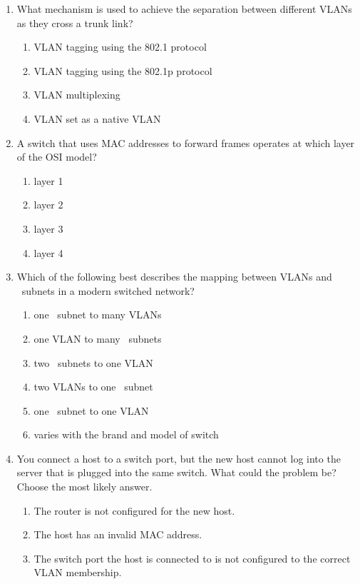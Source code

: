 \begin{enumerate}
\begin{enumerate}
   \item Discard the frame.
   \item Forward the frame out interface~1.
   \item Forward the frame out interface~2.
   \item Forward the frame out interface~3.
   \end{enumerate}
\item
   What mechanism is used to achieve the separation between different \acsp{VLAN} as they cross a trunk link?
   \begin{enumerate}
      \item \acs{VLAN} tagging using the 802.1 protocol
      \item \acs{VLAN} tagging using the 802.1p protocol
      \item \acs{VLAN} multiplexing
      \item \acs{VLAN} set as a native \acs{VLAN}
   \end{enumerate}
\item
   A switch that uses \acs{MAC} addresses to forward frames operates at which layer of the \acs{OSI} model?
   \begin{multicols}{2}
   \begin{enumerate}
   \item layer 1
   \item layer 2
   \item layer 3
   \item layer 4
   \end{enumerate}
   \end{multicols}
\item
   Which of the following best describes the mapping between \acsp{VLAN} and \IP\ subnets in a modern switched network?
   \begin{enumerate}
   \item one \IP\ subnet to many \acsp{VLAN}
   \item one \acs{VLAN} to many \IP\ subnets
   \item two \IP\ subnets to one \acs{VLAN}
   \item two \acsp{VLAN} to one \IP\ subnet
   \item one \IP\ subnet to one \acs{VLAN}
   \item varies with the brand and model of switch
   \end{enumerate}
\item
   You connect a host to a switch port, but the new host cannot log into the server that is plugged into the same switch.
   What could the problem be?
   Choose the most likely answer.
   \begin{enumerate}
   \item The router is not configured for the new host.
   \item The host has an invalid \acs{MAC} address.
   \item The switch port the host is connected to is not configured to the correct \acs{VLAN} membership.
   \end{enumerate}
\end{enumerate}



